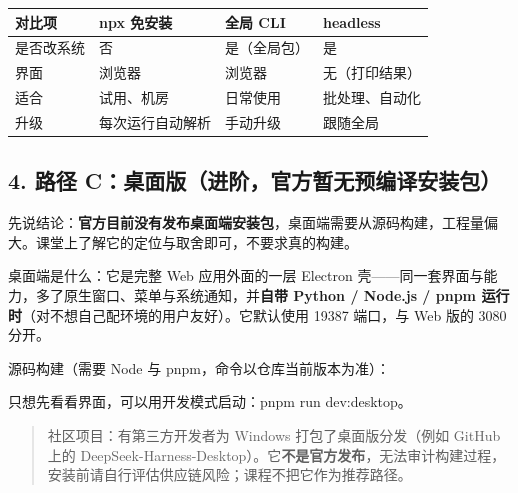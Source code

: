 {\def\LTcaptype{none} %
\begin{longtable}[]{@{}llll@{}}
\toprule\noalign{}
对比项 & npx 免安装 & 全局 CLI & headless \\
\midrule\noalign{}
\endhead
\bottomrule\noalign{}
\endlastfoot
是否改系统 & 否 & 是（全局包） & 是 \\
界面 & 浏览器 & 浏览器 & 无（打印结果） \\
适合 & 试用、机房 & 日常使用 & 批处理、自动化 \\
升级 & 每次运行自动解析 & 手动升级 & 跟随全局 \\
\end{longtable}
}

\subsection{4. 路径
C：桌面版（进阶，官方暂无预编译安装包）}\label{ux8defux5f84-cux684cux9762ux7248ux8fdbux9636ux5b98ux65b9ux6682ux65e0ux9884ux7f16ux8bd1ux5b89ux88c5ux5305}

先说结论：\textbf{官方目前没有发布桌面端安装包}，桌面端需要从源码构建，工程量偏大。课堂上了解它的定位与取舍即可，不要求真的构建。

桌面端是什么：它是完整 Web 应用外面的一层 Electron
壳------同一套界面与能力，多了原生窗口、菜单与系统通知，并\textbf{自带
Python / Node.js / pnpm
运行时}（对不想自己配环境的用户友好）。它默认使用 19387 端口，与 Web
版的 3080 分开。

源码构建（需要 Node 与 pnpm，命令以仓库当前版本为准）：

\begin{Shaded}
\begin{Highlighting}[]
\end{Highlighting}
\end{Shaded}

只想先看看界面，可以用开发模式启动：pnpm run dev:desktop。

\begin{quote}
社区项目：有第三方开发者为 Windows 打包了桌面版分发（例如 GitHub 上的
DeepSeek-Harness-Desktop）。它\textbf{不是官方发布}，无法审计构建过程，安装前请自行评估供应链风险；课程不把它作为推荐路径。
\end{quote}

